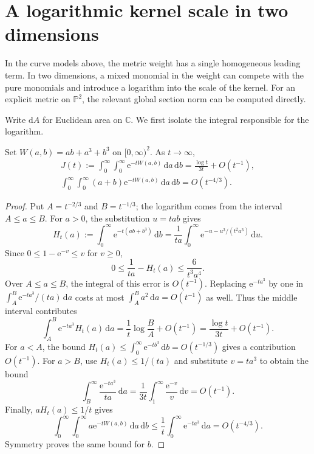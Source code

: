 \section{A logarithmic kernel scale in two dimensions}
\label{sec:logarithmic-kernel-model}

In the curve models above, the metric weight has a single homogeneous leading term. In two dimensions, a mixed monomial in the weight can compete with the pure monomials and introduce a logarithm into the scale of the kernel. For an explicit metric on $\mathbb P^2$, the relevant global section norm can be computed directly.

Write $\mathrm dA$ for Euclidean area on $\mathbb C$. We first isolate the integral responsible for the logarithm.
\begin{lemma}\label{lem:mixed-laplace-logarithm}
Set $W(a,b)=ab+a^3+b^3$ on $[0,\infty)^2$. As $t\to\infty$,
\[
 \begin{gathered}
 J(t):=\int_0^\infty\int_0^\infty
                   \mathrm e^{-tW(a,b)}\,\mathrm da\,\mathrm db
       =\frac{\log t}{3t}+O(t^{-1}),
 \\
 \int_0^\infty\int_0^\infty(a+b)\mathrm e^{-tW(a,b)}
                   \,\mathrm da\,\mathrm db=O(t^{-4/3}).
 \end{gathered}
\]
\end{lemma}
\begin{proof}
Put $A=t^{-2/3}$ and $B=t^{-1/3}$; the logarithm comes from the interval $A\leq a\leq B$. For $a>0$, the substitution $u=tab$ gives
\[
 H_t(a):=\int_0^\infty\mathrm e^{-t(ab+b^3)}\,\mathrm db
       =\frac1{ta}\int_0^\infty
                   \mathrm e^{-u-u^3/(t^2a^3)}\,\mathrm du.
\]
Since $0\leq1-\mathrm e^{-v}\leq v$ for $v\geq0$,
\[
 0\leq\frac1{ta}-H_t(a)\leq\frac6{t^3a^4}.
\]
Over $A\leq a\leq B$, the integral of this error is $O(t^{-1})$. Replacing $\mathrm e^{-ta^3}$ by one in $\int_A^B\mathrm e^{-ta^3}/(ta)\,\mathrm da$ costs at most $\int_A^B a^2\,\mathrm da=O(t^{-1})$ as well. Thus the middle interval contributes
\[
 \int_A^B\mathrm e^{-ta^3}H_t(a)\,\mathrm da
       =\frac1t\log\frac BA+O(t^{-1})
       =\frac{\log t}{3t}+O(t^{-1}).
\]
For $a<A$, the bound $H_t(a)\leq\int_0^\infty\mathrm e^{-tb^3}\,\mathrm db=O(t^{-1/3})$ gives a contribution $O(t^{-1})$. For $a>B$, use $H_t(a)\leq1/(ta)$ and substitute $v=ta^3$ to obtain the bound
\[
 \int_B^\infty\frac{\mathrm e^{-ta^3}}{ta}\,\mathrm da
       =\frac1{3t}\int_1^\infty\frac{\mathrm e^{-v}}v\,\mathrm dv
       =O(t^{-1}).
\]
Finally, $aH_t(a)\leq1/t$ gives
\[
 \int_0^\infty\int_0^\infty a\mathrm e^{-tW(a,b)}
                         \,\mathrm da\,\mathrm db
       \leq\frac1t\int_0^\infty\mathrm e^{-ta^3}\,\mathrm da
       =O(t^{-4/3}).
\]
Symmetry proves the same bound for $b$.
\end{proof}


